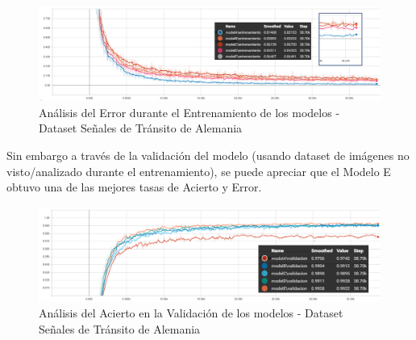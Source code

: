 			\begin{figure}[H]
				\includegraphics[width=1\textwidth, height=\textheight,keepaspectratio]{images/desarrollo/trainResults/germanSummary_entreError} 
				\begin{center}
				\caption{\small{Análisis del Error durante el Entrenamiento de los modelos - Dataset Señales de Tránsito de Alemania}}
				
				{\small{\fontsize{10}{16.8}\selectfont {Fuente: Elaboración propia}}}
				\end{center}
				\vspace{-1.5em}
			\end{figure}	


			Sin embargo a través de la validación del modelo (usando dataset de imágenes no visto/analizado durante el entrenamiento), se puede apreciar que el Modelo E obtuvo una de las mejores tasas de Acierto y Error. 

			\begin{figure}[H]
				\includegraphics[width=1\textwidth, height=\textheight,keepaspectratio]{images/desarrollo/trainResults/germanSummary_validAcierto} 
				\begin{center}
				\caption{\small{Análisis del Acierto en la Validación de los modelos - Dataset Señales de Tránsito de Alemania}}
				
				{\small{\fontsize{10}{16.8}\selectfont {Fuente: Elaboración propia}}}
				\end{center}
				\vspace{-1.5em}
			\end{figure}

